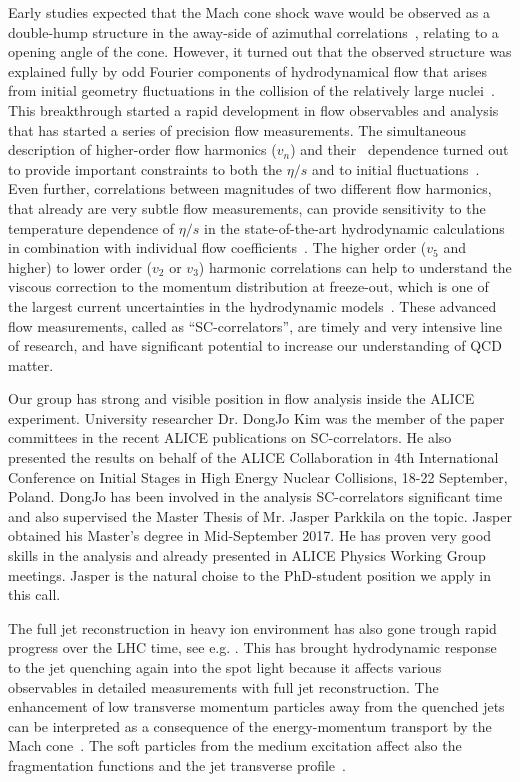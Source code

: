 Early studies expected that the Mach cone shock wave would be observed as a double-hump structure in the away-side of azimuthal correlations~\cite{CasalderreySolana:2004qm}, relating to a opening angle of the cone. However, it turned out that the observed structure was explained fully by odd Fourier components of hydrodynamical flow that arises from initial geometry fluctuations 
in the collision of the relatively large nuclei~\cite{Luzum:2012wu,ALICE:2011ab}. This breakthrough started a rapid development in flow observables and analysis that has started a series of precision flow measurements. The simultaneous description of higher-order flow harmonics ($v_{n}$) and their \pt{}\ dependence turned out to provide important constraints to both the $\eta/s$ and to initial fluctuations~\cite{Luzum:2012wu}. Even further, correlations between magnitudes of two different flow harmonics, that already are very subtle flow measurements, can provide sensitivity to the temperature dependence of $\eta/s$ in the state-of-the-art hydrodynamic calculations~\cite{Niemi:2015qia} in combination with individual flow coefficients~\cite{ALICE:2016kpq}. The higher order ($v_5$ and higher) to lower order ($v_2$ or $v_3$) harmonic correlations can help to understand the viscous correction to the momentum distribution at freeze-out, which is one of the largest current uncertainties in the hydrodynamic models~\cite{PhysRevC.86.044908,Niemi:2015qia}. These advanced flow measurements, called as ``SC-correlators'', are timely and very intensive line of research, and have significant potential to increase our understanding of QCD matter.

Our group has strong and visible position in flow analysis inside the ALICE experiment. University researcher Dr. DongJo Kim was the member of the paper committees in the recent ALICE publications \cite{ALICE:2016kpq,Acharya:2017gsw,Acharya:2017zfg} on SC-correlators. He also presented the results on behalf of the ALICE Collaboration in 4th International Conference on Initial Stages in High Energy Nuclear Collisions, 18-22 September, Poland. DongJo has been involved in the analysis SC-correlators significant time and also supervised the Master Thesis of Mr. Jasper Parkkila on the topic. Jasper obtained his Master's degree in Mid-September 2017. He has proven very good skills in the analysis and already presented in ALICE Physics Working Group meetings. Jasper is the natural choise to the PhD-student position we apply in this call.

The full jet reconstruction in heavy ion environment has also gone trough rapid progress over the LHC time, see e.g. \cite{Abelev:2013kqa}. This has brought hydrodynamic response to the jet quenching again into the spot light because it affects various observables in detailed measurements with full jet reconstruction. The enhancement of low transverse momentum particles away from the quenched jets can be interpreted as a consequence of the energy-momentum transport by the Mach cone~\cite{Tachibana:2014lja}. 
The soft particles from the medium excitation affect also the fragmentation functions and the jet transverse profile~\cite{He:2015pra}.

